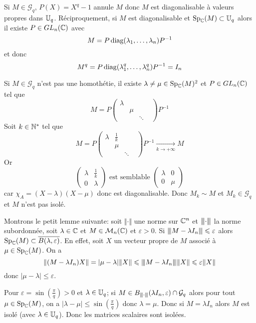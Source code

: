 \begin{solution}
	Si $M\in\mathcal{G}_{q}$, $P(X)=X^{q}-1$ annule $M$ donc $M$ est diagonalisable à valeurs propres dans $\mathbb{U}_{q}$. Réciproquement, si $M$ est diagonalisable et $\operatorname{Sp}_{\mathbb{C}}(M)\subset\mathbb{U}_{q}$ alors il existe $P\in GL_{n}(\mathbb{C})$ avec 
	$$M=P\operatorname{diag}(\lambda_{1},\dots,\lambda_{n})P^{-1}$$
	et donc 
	$$M^{q}=P\operatorname{diag}(\lambda_{1}^{q},\dots,\lambda_{n}^{q})P^{-1}=I_{n}$$

	Si $M\in\mathcal{G}_{q}$ n'est pas une homothétie, il existe $\lambda\neq\mu\in\operatorname{Sp}_{\mathbb{C}}(M)^{2}$ et $P\in GL_{n}(\mathbb{C})$ tel que 
	$$M=P\begin{pmatrix}
		\lambda & &\\
		& \mu & &\\
		& & \ddots
	\end{pmatrix}P^{-1}$$
	Soit $k\in\mathbb{N}^{*}$ tel que 
	$$M=P\begin{pmatrix}
		\lambda & \frac{1}{k}&\\
		& \mu & &\\
		& & \ddots
	\end{pmatrix}P^{-1}\xrightarrow[k\to+\infty]{}M$$
	Or 
	$$\begin{pmatrix}
		\lambda & \frac{1}{k}\\
		0 & \lambda
	\end{pmatrix}\text{  est semblable }\begin{pmatrix}
		\lambda & 0\\
		0 & \mu
	\end{pmatrix}$$
	car $\chi_{A}=(X-\lambda)(X-\mu)$ donc est diagonalisable. Donc $M_{k}\sim M$ et $M_{k}\in\mathcal{G}_{q}$ et $M$ n'est pas isolé.

	Montrons le petit lemme suivante: soit $\Vert\cdot\Vert$ une norme sur $\mathbb{C}^{n}$ et ${\left\vert\kern-0.25ex\left\vert\kern-0.25ex\left\vert{}\cdot \right\vert\kern-0.25ex\right\vert\kern-0.25ex\right\vert}$ la norme subordonnée, soit $\lambda\in\mathbb{C}$ et $M\in\mathcal{M}_{n}(\mathbb{C})$ et $\varepsilon>0$. Si ${\left\vert\kern-0.25ex\left\vert\kern-0.25ex\left\vert{}M-\lambda I_{n} \right\vert\kern-0.25ex\right\vert\kern-0.25ex\right\vert}\leqslant\varepsilon$ alors $\operatorname{Sp}_{\mathbb{C}}(M)\subset\overline{B(\lambda,\varepsilon)}$. En effet, soit $X$ un vecteur propre de $M$ associé à $\mu\in\operatorname{Sp}_{\mathbb{C}}(M)$. On a 
	$$\Vert (M-\lambda I_{n})X\Vert=\vert\mu-\lambda \vert \Vert X\Vert\leqslant{\left\vert\kern-0.25ex\left\vert\kern-0.25ex\left\vert{}M-\lambda I_{n} \right\vert\kern-0.25ex\right\vert\kern-0.25ex\right\vert}\Vert X\Vert\leqslant\varepsilon\Vert X\Vert$$
	donc $\vert\mu-\lambda\vert\leqslant\varepsilon$.

	Pour $\varepsilon=\sin(\frac{\pi}{q})>0$ et $\lambda\in\mathbb{U}_{q}$; si $M\in B_{{\left\vert\kern-0.25ex\left\vert\kern-0.25ex\left\vert{}\cdot \right\vert\kern-0.25ex\right\vert\kern-0.25ex\right\vert}}(\lambda I_{n},\varepsilon)\cap \mathcal{G}_{q}$ alors pour tout $\mu\in\operatorname{Sp}_{\mathbb{C}}(M)$, on a $\vert\lambda-\mu\vert\leqslant\sin(\frac{\pi}{q})$ donc $\lambda=\mu$. Donc si $M=\lambda I_{n}$
	 alors $M$ est isolé (avec $\lambda\in\mathbb{U}_{q}$). Donc les matrices scalaires sont isolées.
\end{solution}